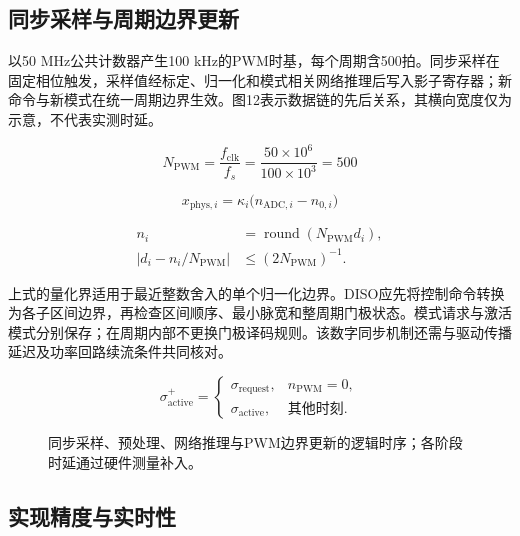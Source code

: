 \documentclass[UTF8,fontset=fandol,a4paper,twocolumn,10pt]{ctexart}
\begin{document}
\subsection{同步采样与周期边界更新}

以50 MHz公共计数器产生100 kHz的PWM时基，每个周期含500拍。同步采样在固定相位触发，采样值经标定、归一化和模式相关网络推理后写入影子寄存器；新命令与新模式在统一周期边界生效。图12表示数据链的先后关系，其横向宽度仅为示意，不代表实测时延。

\begin{equation}N_{\mathrm{PWM}}=\frac{f_{\mathrm{clk}}}{f_s}=\frac{50\times10^6}{100\times10^3}=500\label{eq:38}\end{equation}

\begin{equation}x_{\mathrm{phys},i}=\kappa_i\bigl(n_{\mathrm{ADC},i}-n_{0,i}\bigr)\label{eq:39}\end{equation}

\begin{equation}\begin{aligned}n_i&=\operatorname{round}(N_{\mathrm{PWM}}d_i),\\ |d_i-n_i/N_{\mathrm{PWM}}|&\le (2N_{\mathrm{PWM}})^{-1}.\end{aligned}\label{eq:40}\end{equation}

上式的量化界适用于最近整数舍入的单个归一化边界。DISO应先将控制命令转换为各子区间边界，再检查区间顺序、最小脉宽和整周期门极状态。模式请求与激活模式分别保存；在周期内部不更换门极译码规则。该数字同步机制还需与驱动传播延迟及功率回路续流条件共同核对。

\begin{equation}\sigma_{\mathrm{active}}^{+}=\begin{cases}\sigma_{\mathrm{request}},&n_{\mathrm{PWM}}=0,\\ \sigma_{\mathrm{active}},&\text{其他时刻}.\end{cases}\label{eq:41}\end{equation}

\begin{figure}[!tp]\centering\resizebox{.98\textwidth}{!}{}
\caption{同步采样、预处理、网络推理与PWM边界更新的逻辑时序；各阶段时延通过硬件测量补入。}\label{fig:12}\end{figure}


\subsection{实现精度与实时性}
\end{document}
